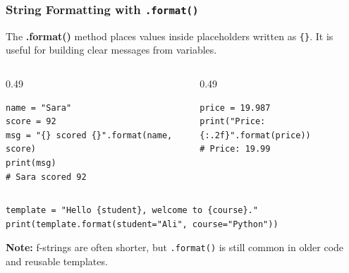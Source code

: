 \documentclass[aspectratio=169,10pt]{beamer}
\newcommand{\keyword}[1]{\textcolor{PrimaryBlue}{\textbf{#1}}}
\newcommand{\codeword}[1]{\texttt{#1}}
\begin{document}
\begin{frame}[fragile]
\frametitle{String Formatting with \texttt{.format()}}
\small
The \keyword{.format()} method places values inside placeholders written as \codeword{\{\}}. It is useful for building clear messages from variables.

\vspace{0.15cm}
\begin{columns}[T,totalwidth=0.96\textwidth]
\begin{column}{0.49\textwidth}
\begin{tcolorbox}[lecturebox,title=Basic placeholders]
\begin{lstlisting}[style=pycodesmall]
name = "Sara"
score = 92
msg = "{} scored {}".format(name, score)
print(msg)
# Sara scored 92
\end{lstlisting}
\end{tcolorbox}
\end{column}
\begin{column}{0.49\textwidth}
\begin{tcolorbox}[lecturebox,title=Number formatting]
\begin{lstlisting}[style=pycodesmall]
price = 19.987
print("Price: {:.2f}".format(price))
# Price: 19.99
\end{lstlisting}
\end{tcolorbox}
\end{column}
\end{columns}

\vspace{0.15cm}
\begin{tcolorbox}[lecturebox,title=Named placeholders]
\begin{lstlisting}[style=pycode]
template = "Hello {student}, welcome to {course}."
print(template.format(student="Ali", course="Python"))
\end{lstlisting}
\end{tcolorbox}

\vspace{-0.05cm}
\textbf{Note:} f-strings are often shorter, but \codeword{.format()} is still common in older code and reusable templates.
\end{frame}
\end{document}
